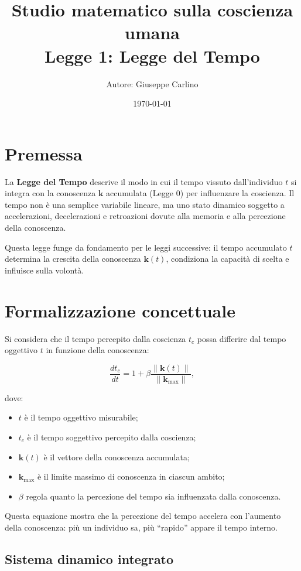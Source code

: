 \documentclass[12pt,a4paper]{article}
\title{\centering Studio matematico sulla coscienza umana \\ Legge 1: Legge del Tempo}
\author{Autore: Giuseppe Carlino}
\date{\today}
\begin{document}
\maketitle

\section{Premessa}

La \textbf{Legge del Tempo} descrive il modo in cui il tempo vissuto dall’individuo $t$ si integra con la conoscenza $\bm{k}$ accumulata (Legge 0) per influenzare la coscienza.  
Il tempo non è una semplice variabile lineare, ma uno stato dinamico soggetto a accelerazioni, decelerazioni e retroazioni dovute alla memoria e alla percezione della conoscenza.  

Questa legge funge da fondamento per le leggi successive: il tempo accumulato $t$ determina la crescita della conoscenza $\bm{k}(t)$, condiziona la capacità di scelta e influisce sulla volontà.

\section{Formalizzazione concettuale}

Si considera che il tempo percepito dalla coscienza $t_c$ possa differire dal tempo oggettivo $t$ in funzione della conoscenza:

\begin{equation}
\frac{dt_c}{dt} = 1 + \beta \frac{\|\bm{k}(t)\|}{\|\bm{k}_{\max}\|},
\end{equation}

dove:
\begin{itemize}
    \item $t$ è il tempo oggettivo misurabile;
    \item $t_c$ è il tempo soggettivo percepito dalla coscienza;
    \item $\bm{k}(t)$ è il vettore della conoscenza accumulata;
    \item $\bm{k}_{\max}$ è il limite massimo di conoscenza in ciascun ambito;
    \item $\beta$ regola quanto la percezione del tempo sia influenzata dalla conoscenza.
\end{itemize}

Questa equazione mostra che la percezione del tempo accelera con l’aumento della conoscenza: più un individuo sa, più “rapido” appare il tempo interno.

\subsection{Sistema dinamico integrato}
\end{document}
